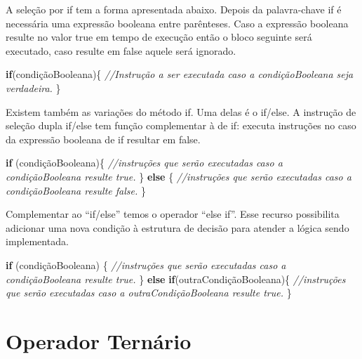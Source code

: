 \documentclass[
]{book}
\newenvironment{Shaded}{\begin{snugshade}}{\end{snugshade}}
\newcommand{\CommentTok}[1]{\textcolor[rgb]{0.56,0.35,0.01}{\textit{#1}}}
\newcommand{\KeywordTok}[1]{\textcolor[rgb]{0.13,0.29,0.53}{\textbf{#1}}}
\newcommand{\NormalTok}[1]{#1}
\begin{document}
A seleção por if tem a forma apresentada abaixo. Depois da palavra-chave if é necessária uma expressão booleana entre parênteses. Caso a expressão booleana resulte no valor true em tempo de execução então o bloco seguinte será executado, caso resulte em false aquele será ignorado.

\begin{Shaded}
\begin{Highlighting}[]
\KeywordTok{if}\NormalTok{(condiçãoBooleana)\{}
  \CommentTok{//Instrução a ser executada caso a condiçãoBooleana seja verdadeira.}
\NormalTok{\}}
\end{Highlighting}
\end{Shaded}

Existem também as variações do método if. Uma delas é o if/else. A instrução de seleção dupla if/else tem função complementar à de if: executa instruções no caso da expressão booleana de if resultar em false.

\begin{Shaded}
\begin{Highlighting}[]
\KeywordTok{if}\NormalTok{ (condiçãoBooleana)\{}
  \CommentTok{//instruções que serão executadas caso a condiçãoBooleana resulte true.}
\NormalTok{\} }\KeywordTok{else}\NormalTok{ \{}
  \CommentTok{//instruções que serão executadas caso a condiçãoBooleana resulte false.}
\NormalTok{\}}
\end{Highlighting}
\end{Shaded}

Complementar ao ``if/else'' temos o operador ``else if''. Esse recurso possibilita adicionar uma nova condição à estrutura de decisão para atender a lógica sendo implementada.

\begin{Shaded}
\begin{Highlighting}[]
\KeywordTok{if}\NormalTok{ (condiçãoBooleana) \{}
    \CommentTok{//instruções que serão executadas caso a condiçãoBooleana resulte true.}
\NormalTok{\} }\KeywordTok{else} \KeywordTok{if}\NormalTok{(outraCondiçãoBooleana)\{}
    \CommentTok{//instruções que serão executadas caso a outraCondiçãoBooleana resulte true.}
\NormalTok{\}}
\end{Highlighting}
\end{Shaded}

\hypertarget{operador-ternuxe1rio}{%
\section{Operador Ternário}\label{operador-ternuxe1rio}}
\end{document}
